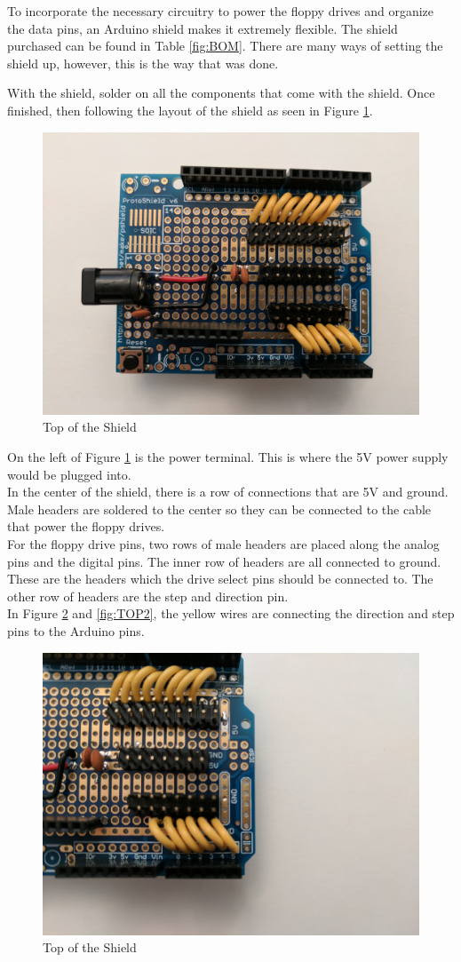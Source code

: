 \documentclass[11pt, a4paper]{report}
\begin{document}
To incorporate the necessary circuitry to power the floppy drives and organize the data pins, an Arduino shield makes it extremely flexible. The shield purchased can be found in Table \ref{fig:BOM}. There are many ways of setting the shield up, however, this is the way that was done. 

With the shield, solder on all the components that come with the shield. Once finished, then following the layout of the shield as seen in Figure \ref{fig:TOP}.

\begin{figure}[H]
\hspace*{-2cm}    
    \centering
    \includegraphics[width=.5\textwidth]{TOP.jpg}
    \caption{Top of the Shield}
    \label{fig:TOP}
\end{figure}

On the left of Figure \ref{fig:TOP} is the power terminal. This is where the 5V power supply would be plugged into. \\

In the center of the shield, there is a row of connections that are 5V and ground. Male headers are soldered to the center so they can be connected to the cable that power the floppy drives. \\

For the floppy drive pins, two rows of male headers are placed along the analog pins and the digital pins. The inner row of headers are all connected to ground. These are the headers which the drive select pins should be connected to. The other row of headers are the step and direction pin. \\

In Figure \ref{fig:TOP1} and \ref{fig:TOP2}, the yellow wires are connecting the direction and step pins to the Arduino pins. \\


\begin{figure}[H]
\hspace*{-2cm}    
    \centering
    \includegraphics[width=.5\textwidth]{TOP1.jpg}
    \caption{Top of the Shield}
    \label{fig:TOP1}
\end{figure}
\end{document}
